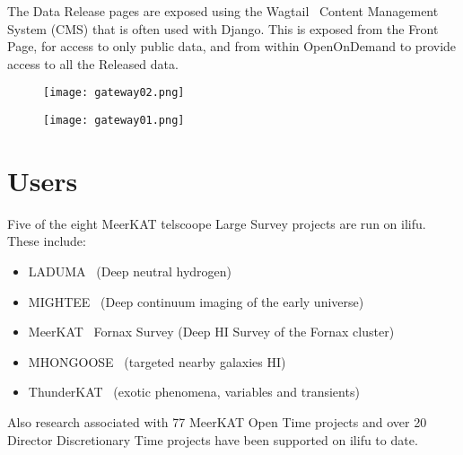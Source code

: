 \documentclass[12pt,twocolumn,a4paper]{article}
\begin{document}
The Data Release pages are exposed using the Wagtail~\cite{Wagtail} Content Management System (CMS)
that is often used with Django. This is exposed from the Front Page, for access to only public data,
and from within OpenOnDemand to provide access to all the Released data.



\begin{figure}
\texttt{[image: gateway02.png]}
\end{figure}

\begin{figure}
    \texttt{[image: gateway01.png]}
\end{figure}
    









\section{Users}
\label{sec:users}

Five of the eight MeerKAT telscoope Large Survey projects are run on ilifu. 
These include:
\begin{itemize}
\item LADUMA~\cite{laduma} (Deep neutral hydrogen)
\item MIGHTEE~\cite{mightee} (Deep continuum imaging of the early universe)
\item MeerKAT~\cite{fornax} Fornax Survey (Deep HI Survey of the Fornax cluster)
\item MHONGOOSE~\cite{fornax} (targeted nearby galaxies HI)
\item ThunderKAT~\cite{thundercat} (exotic phenomena, variables and transients)
\end{itemize}

Also research associated with 
77 MeerKAT Open Time projects and over 20 Director Discretionary Time projects have been supported
on ilifu to date.
\end{document}
